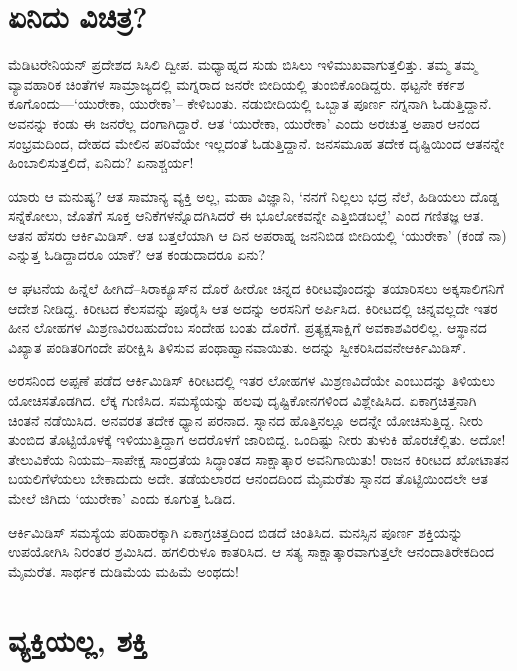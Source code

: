\section*{ಏನಿದು ವಿಚಿತ್ರ?}


ಮೆಡಿಟರೇನಿಯನ್ ಪ್ರದೇಶದ ಸಿಸಿಲಿ ದ್ವೀಪ. ಮಧ್ಯಾಹ್ನದ ಸುಡು ಬಿಸಿಲು ಇಳಿಮುಖವಾಗುತ್ತ\-ಲಿತ್ತು. ತಮ್ಮ ತಮ್ಮ ವ್ಯಾವಹಾರಿಕ ಚಿಂತೆಗಳ ಸಾಮ್ರಾಜ್ಯದಲ್ಲಿ ಮಗ್ನರಾದ ಜನರೇ ಬೀದಿಯಲ್ಲಿ ತುಂಬಿ\-ಕೊಂಡಿದ್ದರು. ಥಟ್ಟನೇ ಕರ್ಕಶ ಕೂಗೊಂದು—‘ಯುರೇಕಾ, ಯುರೇಕಾ’– ಕೇಳಿಬಂತು. ನಡುಬೀದಿಯಲ್ಲಿ ಒಬ್ಬಾತ ಪೂರ್ಣ ನಗ್ನನಾಗಿ ಓಡುತ್ತಿದ್ದಾನೆ. ಅವನನ್ನು ಕಂಡು ಈ ಜನರೆಲ್ಲ ದಂಗಾಗಿದ್ದಾರೆ. ಆತ ‘ಯುರೇಕಾ, ಯುರೇಕಾ’ ಎಂದು ಅರಚುತ್ತ ಅಪಾರ ಆನಂದ ಸಂಭ್ರಮದಿಂದ, ದೇಹದ ಮೇಲಿನ ಪರಿವೆಯೇ ಇಲ್ಲದಂತೆ ಓಡುತ್ತಿದ್ದಾನೆ. ಜನಸಮೂಹ ತದೇಕ ದೃಷ್ಟಿಯಿಂದ ಆತನನ್ನೇ ಹಿಂಬಾಲಿಸುತ್ತಲಿದೆ, ಏನಿದು? ಏನಾಶ್ಚರ್ಯ!

\vskip 2pt

ಯಾರು ಆ ಮನುಷ್ಯ? ಆತ ಸಾಮಾನ್ಯ ವ್ಯಕ್ತಿ ಅಲ್ಲ, ಮಹಾ ವಿಜ್ಞಾನಿ, ‘ನನಗೆ ನಿಲ್ಲಲು ಭದ್ರ ನೆಲೆ, ಹಿಡಿಯಲು ದೊಡ್ಡ ಸನ್ನೆಕೋಲು, ಜೊತೆಗೆ ಸೂಕ್ತ ಆನಿಕೆಗಳನ್ನೊದಗಿಸಿದರೆ ಈ ಭೂಲೋಕವನ್ನೇ ಎತ್ತಿಬಿಡಬಲ್ಲೆ’ ಎಂದ ಗಣಿತಜ್ಞ ಆತ. ಆತನ ಹೆಸರು ಆರ್ಕಿಮಿಡಿಸ್. ಆತ ಬತ್ತಲೆಯಾಗಿ ಆ ದಿನ ಅಪರಾಹ್ನ ಜನನಿಬಿಡ ಬೀದಿಯಲ್ಲಿ ‘ಯುರೇಕಾ’ (ಕಂಡೆ ನಾ) ಎನ್ನುತ್ತ ಓಡಿದ್ದಾದರೂ ಯಾಕೆ? ಆತ ಕಂಡುದಾದರೂ ಏನು?

\vskip 2pt

ಆ ಘಟನೆಯ ಹಿನ್ನೆಲೆ ಹೀಗಿದೆ–ಸಿರಾಕ್ಯೂಸ್​ನ ದೊರೆ ಹೀರೋ ಚಿನ್ನದ ಕಿರೀಟವೊಂದನ್ನು ತಯಾರಿಸಲು ಅಕ್ಕಸಾಲಿಗನಿಗೆ ಆದೇಶ ನೀಡಿದ್ದ. ಕಿರೀಟದ ಕೆಲಸವನ್ನು ಪೂರೈಸಿ ಆತ ಅದನ್ನು ಅರಸನಿಗೆ ಅರ್ಪಿಸಿದ. ಕಿರೀಟದಲ್ಲಿ ಚಿನ್ನವಲ್ಲದೇ ಇತರ ಹೀನ ಲೋಹಗಳ ಮಿಶ್ರಣ\-ವಿರ\-ಬಹುದೆಂಬ ಸಂದೇಹ ಬಂತು ದೊರೆಗೆ. ಪ್ರತ್ಯಕ್ಷಸಾಕ್ಷಿಗೆ ಅವಕಾಶವಿರಲಿಲ್ಲ. ಆಸ್ಥಾನದ ವಿಖ್ಯಾತ ಪಂಡಿತರಿಗಂದೇ ಪರೀಕ್ಷಿಸಿ ತಿಳಿಸುವ ಪಂಥಾಹ್ವಾನವಾಯಿತು. ಅದನ್ನು ಸ್ವೀಕರಿಸಿದವನೇ\break ಆರ್ಕಿಮಿಡಿಸ್.

\vskip 2pt

ಅರಸನಿಂದ ಅಪ್ಪಣೆ ಪಡೆದ ಆರ್ಕಿಮಿಡಿಸ್ ಕಿರೀಟದಲ್ಲಿ ಇತರ ಲೋಹಗಳ ಮಿಶ್ರಣವಿದೆಯೇ ಎಂಬುದನ್ನು ತಿಳಿಯಲು ಯೋಚಿಸತೊಡಗಿದ. ಲೆಕ್ಕ ಗುಣಿಸಿದ. ಸಮಸ್ಯೆಯನ್ನು ಹಲವು ದೃಷ್ಟಿಕೋನಗಳಿಂದ ವಿಶ್ಲೇಷಿಸಿದ. ಏಕಾಗ್ರಚಿತ್ತನಾಗಿ ಚಿಂತನೆ ನಡೆಯಿಸಿದ. ಅನವರತ ತದೇಕ ಧ್ಯಾನ ಪರನಾದ. ಸ್ನಾನದ ಹೊತ್ತಿನಲ್ಲೂ ಅದನ್ನೇ ಯೋಚಿಸುತ್ತಿದ್ದ. ನೀರು ತುಂಬಿದ ತೊಟ್ಟಿಯೊಳಕ್ಕೆ ಇಳಿಯುತ್ತಿದ್ದಾಗ ಅದರೊಳಗೆ ಜಾರಿಬಿದ್ದ. ಒಂದಿಷ್ಟು ನೀರು ತುಳುಕಿ ಹೊರಚೆಲ್ಲಿತು. ಅದೋ! ತೇಲುವಿಕೆಯ ನಿಯಮ–ಸಾಪೇಕ್ಷ ಸಾಂದ್ರತೆಯ ಸಿದ್ಧಾಂತದ ಸಾಕ್ಷಾತ್ಕಾರ ಅವನಿಗಾಯಿತು! ರಾಜನ ಕಿರೀಟದ ಖೋಟಾತನ ಬಯಲಿಗೆಳೆಯಲು ಬೇಕಾದುದು ಅದೇ. ತಡೆಯಲಾರದ ಆನಂದದಿಂದ ಮೈಮರೆತು ಸ್ನಾನದ ತೊಟ್ಟಿಯಿಂದಲೇ ಆತ ಮೇಲೆ ಜಿಗಿದು ‘ಯುರೇಕಾ’ ಎಂದು ಕೂಗುತ್ತ ಓಡಿದ.

ಆರ್ಕಿಮಿಡಿಸ್ ಸಮಸ್ಯೆಯ ಪರಿಹಾರಕ್ಕಾಗಿ ಏಕಾಗ್ರಚಿತ್ತದಿಂದ ಬಿಡದೆ ಚಿಂತಿಸಿದ. ಮನಸ್ಸಿನ ಪೂರ್ಣ ಶಕ್ತಿಯನ್ನು ಉಪಯೋಗಿಸಿ ನಿರಂತರ ಶ್ರಮಿಸಿದ. ಹಗಲಿರುಳೂ ಕಾತರಿಸಿದ. ಆ ಸತ್ಯ ಸಾಕ್ಷಾತ್ಕಾರವಾಗುತ್ತಲೇ ಆನಂದಾತಿರೇಕದಿಂದ ಮೈಮರೆತ. ಸಾರ್ಥಕ ದುಡಿಮೆಯ ಮಹಿಮೆ ಅಂಥದು!


\section*{ವ್ಯಕ್ತಿಯಲ್ಲ, ಶಕ್ತಿ}

